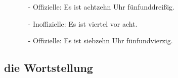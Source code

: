 \begin{multicols}{2}
\begin{itemize}[topsep=0pt,itemsep=4pt,parsep=0pt]
\begin{itemize}
                            \item[-] Offizielle: {\color{saffron}Es ist achtzehn Uhr fünfunddreißig.}
                        \end{itemize}
                    \item[] {\color{deep_carmine}}
                        \begin{itemize}
                            \item[-] Inoffizielle: {\color{deep_carmine}Es ist  viertel vor acht.}
                            \item[-] Offizielle: {\color{deep_carmine}Es ist siebzehn Uhr fünfundvierzig.}
                        \end{itemize}
                \end{itemize}
            \vfill\null
            \end{multicols}

    \subsection{die Wortstellung}\label{subsection:deutsch:wortstellung}

    
